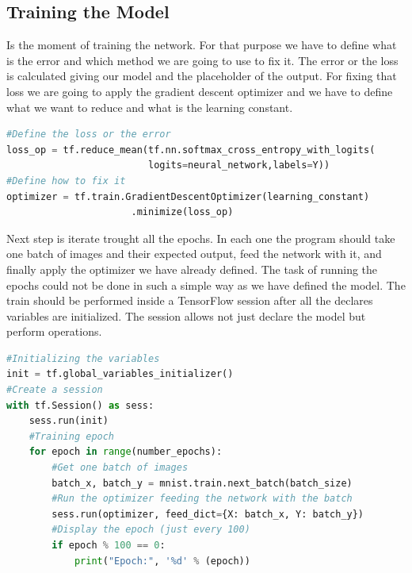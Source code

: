 \subsection{Training the Model}
Is the moment of training the network. For that purpose we have to define what is the error and which method we are going to use to fix it. The error or the loss is calculated giving our model and the placeholder of the output. For fixing that loss we are going to apply the gradient descent optimizer and we have to define what we want to reduce and what is the learning constant.

\begin{lstlisting}[language=python]
#Define the loss or the error
loss_op = tf.reduce_mean(tf.nn.softmax_cross_entropy_with_logits(
                         logits=neural_network,labels=Y))
#Define how to fix it
optimizer = tf.train.GradientDescentOptimizer(learning_constant)
                      .minimize(loss_op)
\end{lstlisting}

Next step is iterate trought all the epochs. In each one the program should take one batch of images and their expected output, feed the network with it, and finally apply the optimizer we have already defined. The task of running the epochs could not be done in such a simple way as we have defined the model. The train should be performed inside a TensorFlow session after all the declares variables are initialized. The session allows not just declare the model but perform operations.

\begin{lstlisting}[language=python]
#Initializing the variables
init = tf.global_variables_initializer()
#Create a session
with tf.Session() as sess:
    sess.run(init)
    #Training epoch
    for epoch in range(number_epochs):
        #Get one batch of images
        batch_x, batch_y = mnist.train.next_batch(batch_size)
        #Run the optimizer feeding the network with the batch
        sess.run(optimizer, feed_dict={X: batch_x, Y: batch_y})
        #Display the epoch (just every 100)
        if epoch % 100 == 0:
            print("Epoch:", '%d' % (epoch))
\end{lstlisting}

